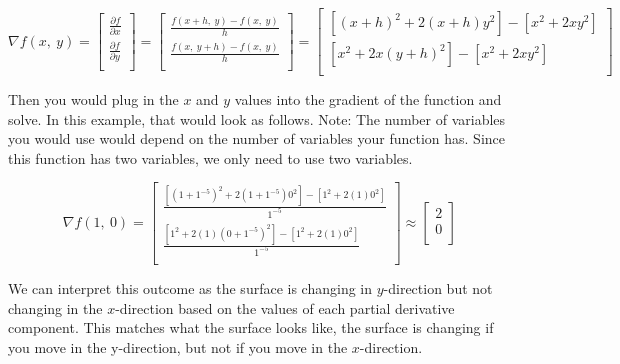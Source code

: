 \documentclass[10pt,letterpaper,onecolumn,report]{tau-class/tau}
\begin{document}
        \begin{equation}
            \nabla f\left(x,\ y\right)=\left[\begin{matrix}\frac{\partial f}{\partial x}\\\frac{\partial f}{\partial y}\\\end{matrix}\right]=\left[\begin{matrix}\frac{f\left(x+h,\ y\right)-f(x,\ y)}{h}\\\frac{f\left(x,\ y+h\right)-f(x,\ y)}{h}\\\end{matrix}\right]=\left[\begin{matrix}\left[{(x+h)}^2+2(x+h)y^2\right]-\left[x^2+2xy^2\right]\\\left[x^2+2x\left(y+h\right)^2\right]-\left[x^2+2xy^2\right]\\\end{matrix}\right]
        \end{equation}

        Then you would plug in the \(x\) and \(y\) values into the gradient of the function and solve. In this example, that would look as follows. Note: The number of variables you would use would depend on the number of variables your function has. Since this function has two variables, we only need to use two variables.

        \begin{equation}
            \nabla f\left(1,\ 0\right)=\left[\begin{matrix}\frac{\left[{(1+1^{-5})}^2+2(1+1^{-5})0^2\right]-\left[1^2+2(1)0^2\right]}{1^{-5}}\\\frac{\left[1^2+2(1)\left(0+1^{-5}\right)^2\right]-\left[1^2+2(1)0^2\right]}{1^{-5}}\\\end{matrix}\right]\approx\left[\begin{matrix}2\\0\\\end{matrix}\right]
        \end{equation}

        We can interpret this outcome as the surface is changing in \(y\)-direction but not changing in the \(x\)-direction based on the values of each partial derivative component. This matches what the surface looks like, the surface is changing if you move in the y-direction, but not if you move in the \(x\)-direction.
\end{document}
